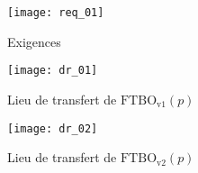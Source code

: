 \begin{figure}[H]
\centering

\texttt{[image: req\_01]}

\caption{Exigences \label{ann_01}}
\end{figure}

\begin{figure}[H]
\centering
\texttt{[image: dr\_01]}

\caption{Lieu de transfert de $\text{FTBO}_{\text{v1}}(p)$ \label{dr_01}}
\end{figure}

\begin{figure}[H]
\centering
\texttt{[image: dr\_02]}

\caption{Lieu de transfert de $\text{FTBO}_{\text{v2}}(p)$ \label{dr_02}}
\end{figure}

%
%
%
%
%
%
